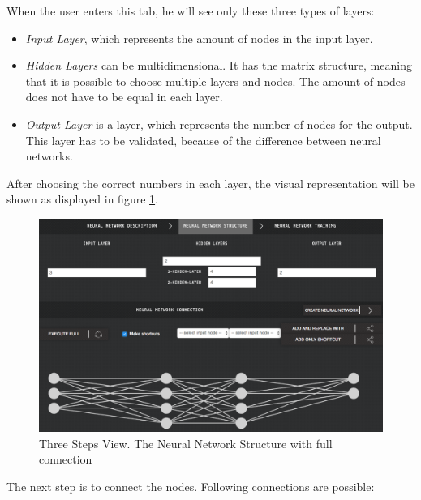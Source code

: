 When the user enters this tab, he will see only these three types of layers: 
\begin{itemize}
\item \emph{Input Layer}, which represents the amount of nodes in the input layer.
\item \emph{Hidden Layers} can be multidimensional. It has the matrix structure, meaning that it is possible to choose multiple layers and nodes. The amount of nodes does not have to be equal in each layer.
\item \emph{Output Layer} is a layer, which represents the number of nodes for the output. This layer has to be validated, because of the difference between neural networks. 
\end{itemize}

After choosing the correct numbers in each layer, the visual representation will be shown as displayed in figure \ref{fig:nn_structure_3_steps}.


\begin{figure}[htbp]
\begin{center}
  \includegraphics[width=\linewidth]{components/5/img/nn_structure_3_steps.png}
  \caption{Three Steps View. The Neural Network Structure with full connection}
  \label{fig:nn_structure_3_steps}
\end{center}
\end{figure}

The next step is to connect the nodes. Following connections are possible:

